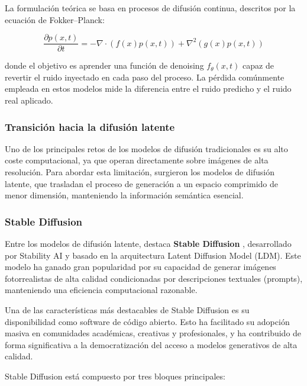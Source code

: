 La formulación teórica se basa en procesos de difusión continua, descritos por la ecuación de Fokker–Planck:

\begin{equation}
\frac{\partial p(x,t)}{\partial t} = - \nabla \cdot (f(x)p(x,t)) + \nabla^2 (g(x)p(x,t))
\end{equation}

donde el objetivo es aprender una función de denoising $f_\theta(x,t)$ capaz de revertir el ruido inyectado en cada paso del proceso. La pérdida comúnmente empleada en estos modelos mide la diferencia entre el ruido predicho y el ruido real aplicado.

\subsubsection{Transición hacia la difusión latente}

Uno de los principales retos de los modelos de difusión tradicionales es su alto coste computacional, ya que operan directamente sobre imágenes de alta resolución. Para abordar esta limitación, surgieron los modelos de difusión latente, que trasladan el proceso de generación a un espacio comprimido de menor dimensión, manteniendo la información semántica esencial.

\subsubsection{Stable Diffusion}

Entre los modelos de difusión latente, destaca \textbf{Stable Diffusion} \cite{rombach2022high}, desarrollado por Stability AI y basado en la arquitectura Latent Diffusion Model (LDM). Este modelo ha ganado gran popularidad por su capacidad de generar imágenes fotorrealistas de alta calidad condicionadas por descripciones textuales (prompts), manteniendo una eficiencia computacional razonable.

Una de las características más destacables de Stable Diffusion es su disponibilidad como software de código abierto. Esto ha facilitado su adopción masiva en comunidades académicas, creativas y profesionales, y ha contribuido de forma significativa a la democratización del acceso a modelos generativos de alta calidad.

Stable Diffusion está compuesto por tres bloques principales:

